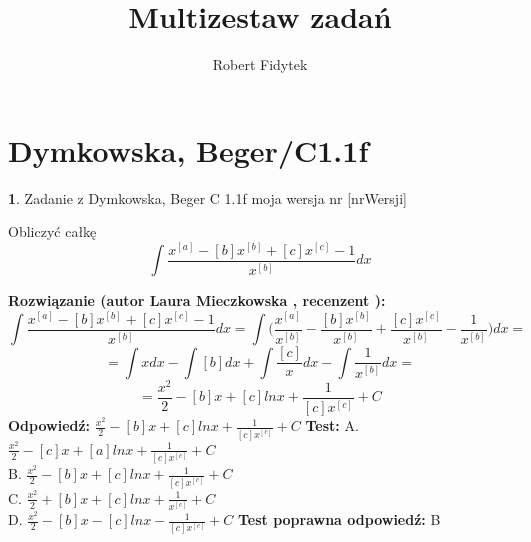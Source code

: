 \documentclass[12pt, a4paper]{article}
\title{Multizestaw zadań}
\author{Robert Fidytek}
\date{}
\theoremstyle{definition} %
\newtheorem{zad}{}
\newcommand{\kategoria}[1]{\section{#1}} %
\newcommand{\zadStart}[1]{\begin{zad}#1\newline} %
\newcommand{\zadStop}{\end{zad}}   %
\newcommand{\rozwStart}[2]{\noindent \textbf{Rozwiązanie (autor #1 , recenzent #2): }\newline} %
\newcommand{\rozwStop}{\newline}                                            %
\newcommand{\odpStart}{\noindent \textbf{Odpowiedź:}\newline}    %
\newcommand{\odpStop}{\newline}                                             %
\newcommand{\testStart}{\noindent \textbf{Test:}\newline} %
\newcommand{\testStop}{\newline} %
\newcommand{\kluczStart}{\noindent \textbf{Test poprawna odpowiedź:}\newline} %
\newcommand{\kluczStop}{\newline} %
\begin{document}
\maketitle


\kategoria{Dymkowska, Beger/C1.1f}
\zadStart{Zadanie z Dymkowska, Beger C 1.1f moja wersja nr [nrWersji]}

Obliczyć całkę $$\int \frac{x^{[a]}-[b]x^{[b]}+[c]x^{[c]}-1}{x^{[b]}}dx$$
\zadStop
\rozwStart{Laura Mieczkowska}{}
$$\int \frac{x^{[a]}-[b]x^{[b]}+[c]x^{[c]}-1}{x^{[b]}}dx=\int \bigg(\frac{x^{[a]}}{x^{[b]}}-\frac{[b]x^{[b]}}{x^{[b]}}+\frac{[c]x^{[c]}}{x^{[b]}}-\frac{1}{x^{[b]}}\bigg)dx=$$
$$=\int xdx-\int [b]dx+\int \frac{[c]}{x}dx-\int \frac{1}{x^{[b]}}dx=$$
$$=\frac{x^2}{2}-[b]x+[c]lnx+\frac{1}{[c]x^{[c]}}+C$$
\rozwStop
\odpStart
$\frac{x^2}{2}-[b]x+[c]lnx+\frac{1}{[c]x^{[c]}}+C$
\odpStop
\testStart
A. $\frac{x^2}{2}-[c]x+[a]lnx+\frac{1}{[c]x^{[c]}}+C$ \\
B. $\frac{x^2}{2}-[b]x+[c]lnx+\frac{1}{[c]x^{[c]}}+C$ \\
C. $\frac{x^2}{2}+[b]x+[c]lnx+\frac{1}{x^{[c]}}+C$ \\
D. $\frac{x^2}{2}-[b]x-[c]lnx-\frac{1}{[c]x^{[c]}}+C$
\testStop
\kluczStart
B
\kluczStop
\end{document}
